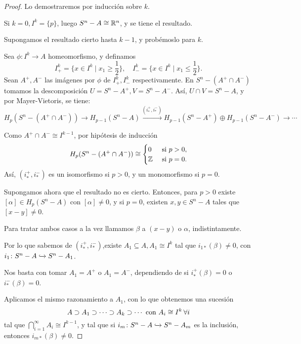 \begin{proof}
  Lo demostraremos por inducción sobre $k$.

  Si $k = 0, I^k = \{p\}$, luego $S^n - A \cong \mathbb{R}^n$, y se tiene el resultado.

  Supongamos el resultado cierto hasta $k-1$, y probémoslo para $k$.

  Sea $\phi \colon I^k \to A$ homeomorfismo, y definamos
  \[ I_+^k = \{x \in I^k \mid x_1 \geq \frac{1}{2}\}, \quad I_-^k = \{x \in I^k \mid x_1 \leq \frac{1}{2}\}.\]
  Sean $A^+, A^-$ las imágenes por $\phi$ de $I_+^k, I_-^k$ respectivamente.
  En $S^n - (A^+ \cap A^-)$ tomamos la descomposición $U = S^n - A^+, V = S^n - A^-$. Así,
  $U \cap V = S^n - A$, y por Mayer-Vietoris, se tiene:
  \[ H_p(S^n - (A^+ \cap A^-)) \to H_{p-1}(S^n - A) \xrightarrow{(i_*^+, i_*^-)} H_{p-1}(S^n - A^+) \oplus H_{p-1}(S^n - A^-) \to \dotsb \]

  Como $A^+ \cap A^- \cong I^{k-1}$, por hipótesis de inducción \\
  \[H_p(S^n - (A^+ \cap A^-)) \cong \begin{cases} 0 &\text{ si } p > 0, \\
                                                \mathbb{Z} &\text{ si } p = 0. \end{cases}\]
  Así, $(i_*^+, i_*^-)$ es un isomorfismo si $p > 0$, y un monomorfismo si $p = 0$.

  Supongamos ahora que el resultado no es cierto. Entonces, para $p > 0$ existe $[\alpha] \in H_p(S^n - A)$ con $[\alpha] \neq 0$, y
  si $p = 0$, existen $x, y \in S^n - A$ tales que $[x-y] \neq 0$.

  Para tratar ambos casos a la vez llamamos $\beta$ a $(x-y)$ o $\alpha$, indistintamente.

  Por lo que sabemos de $(i_*^+, i_*^-)$,existe $A_1 \subseteq A, A_1 \cong I^k$ tal que
  $i_{1*}(\beta) \neq 0$, con $i_1 \colon S^n - A \xhookrightarrow{} S^n - A_1$.

  Nos basta con tomar $A_1 = A^+$ o $A_1 = A^-$, dependiendo de si $i_*^+(\beta) = 0$ o $i_*^-(\beta) = 0$.

  Aplicamos el mismo razonamiento a $A_1$, con lo que obtenemos una sucesión
  \[ A \supset A_1 \supset \dots \supset A_k \supset \dotsb \text{ con } A_i \cong I^k \hspace{0.2em} \forall i \]
  tal que $\bigcap\limits_{i = 1}^\infty A_i \cong I^{k-1}$, y tal que si $i_m \colon S^n - A \xhookrightarrow{} S^n - A_m$
  es la inclusión, entonces $i_{m*}(\beta) \neq 0$.


\end{proof}

